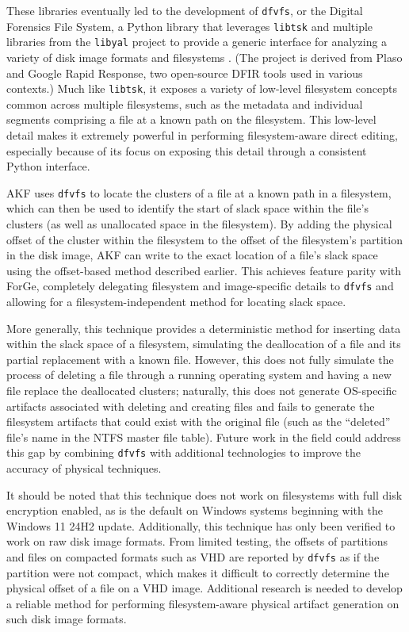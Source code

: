 \documentclass[letterpaper,12pt]{report}
\newcommand{\passthrough}[1]{#1}
\begin{document}
These libraries eventually led to the development of
\passthrough{\lstinline!dfvfs!}, or the Digital Forensics File System, a
Python library that leverages \passthrough{\lstinline!libtsk!} and
multiple libraries from the \passthrough{\lstinline!libyal!} project to
provide a generic interface for analyzing a variety of disk image
formats and filesystems \cite{Log2timelineDfvfs2025}. (The project
is derived from Plaso and Google Rapid Response, two open-source DFIR
tools used in various contexts.) Much like
\passthrough{\lstinline!libtsk!}, it exposes a variety of low-level
filesystem concepts common across multiple filesystems, such as the
metadata and individual segments comprising a file at a known path on
the filesystem. This low-level detail makes it extremely powerful in
performing filesystem-aware direct editing, especially because of its
focus on exposing this detail through a consistent Python interface.

AKF uses \passthrough{\lstinline!dfvfs!} to locate the clusters of a
file at a known path in a filesystem, which can then be used to identify
the start of slack space within the file's clusters (as well as
unallocated space in the filesystem). By adding the physical offset of
the cluster within the filesystem to the offset of the filesystem's
partition in the disk image, AKF can write to the exact location of a
file's slack space using the offset-based method described earlier. This
achieves feature parity with ForGe, completely delegating filesystem and
image-specific details to \passthrough{\lstinline!dfvfs!} and allowing
for a filesystem-independent method for locating slack space.

More generally, this technique provides a deterministic method for
inserting data within the slack space of a filesystem, simulating the
deallocation of a file and its partial replacement with a known file.
However, this does not fully simulate the process of deleting a file
through a running operating system and having a new file replace the
deallocated clusters; naturally, this does not generate OS-specific
artifacts associated with deleting and creating files and fails to
generate the filesystem artifacts that could exist with the original
file (such as the ``deleted'' file's name in the NTFS master file
table). Future work in the field could address this gap by combining
\passthrough{\lstinline!dfvfs!} with additional technologies to improve
the accuracy of physical techniques.

It should be noted that this technique does not work on filesystems with
full disk encryption enabled, as is the default on Windows systems
beginning with the Windows 11 24H2 update. Additionally, this technique
has only been verified to work on raw disk image formats. From limited
testing, the offsets of partitions and files on compacted formats such
as VHD are reported by \passthrough{\lstinline!dfvfs!} as if the
partition were not compact, which makes it difficult to correctly
determine the physical offset of a file on a VHD image. Additional
research is needed to develop a reliable method for performing
filesystem-aware physical artifact generation on such disk image
formats.
\end{document}
